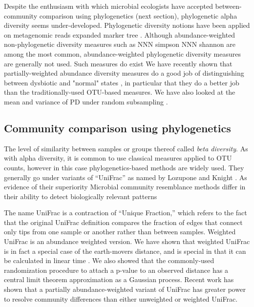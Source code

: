 \documentclass{amsart}
\begin{document}
Despite the enthusiasm with which microbial ecologists have accepted between-community comparison using phylogenetics (next section), phylogenetic alpha diversity seems under-developed.
Phylogenetic diversity notions have been applied on metagenomic reads expanded marker tree \citep{kembel2011phylogenetic}.
Although abundance-weighted non-phylogenetic diversity measures such as NNN simpson NNN shannon are among the most common, abundance-weighted phylogenetic diversity measures are generally not used.
Such measures do exist \citep{chao2010phylogenetic}
We have recently shown that partially-weighted abundance diversity measures do a good job of distinguishing between dysbiotic and "normal" states \citep{mccoy2013abundance}, in particular that they do a better job than the traditionally-used OTU-based measures.
We have also looked at the mean and variance of PD under random subsampling \citep{nipperess2013mean}.


\subsection{Community comparison using phylogenetics}
The level of similarity between samples or groups thereof called \emph{beta diversity}.
As with alpha diversity, it is common to use classical measures \citep[e.g.][]{jaccard1908nouvelles} applied to OTU counts, however in this case phylogenetics-based methods are widely used.
They generally go under variants of ``UniFrac'' as named by Lozupone and Knight \citep{LozuponeKnightUniFrac05;LozuponeEaWeightedUnifrac07}.
As evidence of their superiority
\citep{kuczynski2010microbial} Microbial community resemblance methods differ in their ability to detect biologically relevant patterns

The name UniFrac is a contraction of ``Unique Fraction,'' which refers to the fact that the original UniFrac definition compares the fraction of edges that connect only tips from one sample or another rather than between samples.
Weighted UniFrac is an abundance weighted version.
We have shown that weighted UniFrac is in fact a special case of the earth-movers distance, and is special in that it can be calculated in linear time \citep{evans2012phylogenetic}.
We also showed that the commonly-used randomization procedure to attach a p-value to an observed distance has a central limit theorem approximation as a Gaussian process.
Recent work \citep{chen2012associating} has shown that a partially abundance-weighted variant of UniFrac has greater power to resolve community differences than either unweighted or weighted UniFrac.
\end{document}
